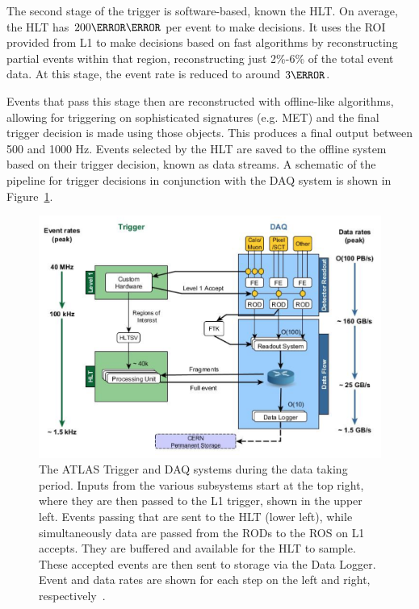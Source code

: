The second stage of the trigger is software-based, known the \gls{HLT}. On average, the \gls{HLT} has $\unit{200}{\micro\second}$ per event to make decisions. It uses the \gls{ROI} provided from \gls{L1} to make decisions based on fast algorithms by reconstructing partial events within that region, reconstructing just 2\%-6\% of the total event data. At this stage, the event rate is reduced to around $\unit{3}{\kHz}$.

Events that pass this stage then are reconstructed with offline-like algorithms, allowing for triggering on sophisticated signatures (e.g. \gls{MET}) and the final trigger decision is made using those objects. This produces a final output between 500 and 1000 Hz. Events selected by the \gls{HLT} are saved to the offline system based on their trigger decision, known as data streams. A schematic of the pipeline for trigger decisions in conjunction with the \gls{DAQ} system is shown in Figure~\ref{fig:trigger-schematic}.


\begin{figure}[!ht]
    \centering
    \includegraphics[width=.80\textwidth]{chapters/chapter2_experiment/images/trigger.png}
    \caption[The ATLAS Trigger and DAQ system during the \RunTwo data taking period]{The ATLAS Trigger and DAQ systems during the \RunTwo data taking period. Inputs from the various subsystems start at the top right, where they are then passed to the \gls{L1} trigger, shown in the upper left. Events passing that are sent to the \gls{HLT} (lower left), while simultaneously data are passed from the \glspl{ROD} to the \gls{ROS} on \gls{L1} accepts. They are buffered and available for the \gls{HLT} to sample. These accepted events are then sent to storage via the Data Logger. Event and data rates are shown for each step on the left and right, respectively~\cite{trigger-run2}.}
    \label{fig:trigger-schematic}
\end{figure}

